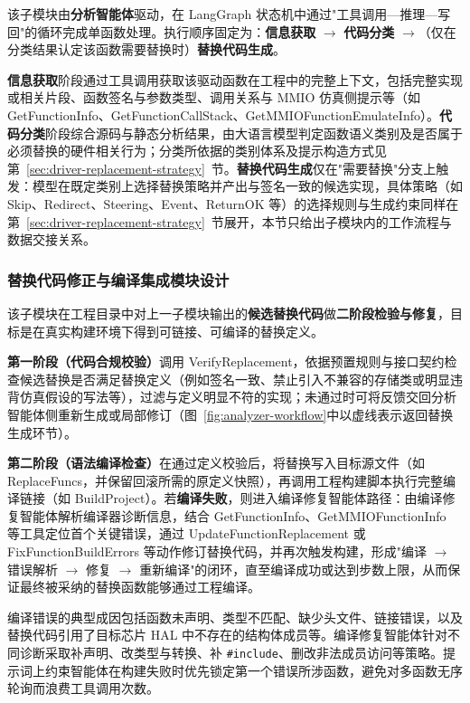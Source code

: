 该子模块由\textbf{分析智能体}驱动，在 LangGraph 状态机中通过"工具调用—推理—写回"的循环完成单函数处理。执行顺序固定为：\textbf{信息获取} $\to$ \textbf{代码分类} $\to$（仅在分类结果认定该函数需要替换时）\textbf{替换代码生成}。

\textbf{信息获取}阶段通过工具调用获取该驱动函数在工程中的完整上下文，包括完整实现或相关片段、函数签名与参数类型、调用关系与 MMIO 仿真侧提示等（如 GetFunctionInfo、GetFunctionCallStack、GetMMIOFunctionEmulateInfo）。\textbf{代码分类}阶段综合源码与静态分析结果，由大语言模型判定函数语义类别及是否属于必须替换的硬件相关行为；分类所依据的类别体系及提示构造方式见第~\ref{sec:driver-replacement-strategy}~节。\textbf{替换代码生成}仅在"需要替换"分支上触发：模型在既定类别上选择替换策略并产出与签名一致的候选实现，具体策略（如 Skip、Redirect、Steering、Event、ReturnOK 等）的选择规则与生成约束同样在第~\ref{sec:driver-replacement-strategy}~节展开，本节只给出子模块内的工作流程与数据交接关系。

\subsubsection{替换代码修正与编译集成模块设计}
\label{sec:builder-workflow}

该子模块在工程目录中对上一子模块输出的\textbf{候选替换代码}做\textbf{二阶段检验与修复}，目标是在真实构建环境下得到可链接、可编译的替换定义。

\textbf{第一阶段（代码合规校验）}调用 VerifyReplacement，依据预置规则与接口契约检查候选替换是否满足替换定义（例如签名一致、禁止引入不兼容的存储类或明显违背仿真假设的写法等），过滤与定义明显不符的实现；未通过时可将反馈交回分析智能体侧重新生成或局部修订（图~\ref{fig:analyzer-workflow}中以虚线表示返回替换生成环节）。

\textbf{第二阶段（语法编译检查）}在通过定义校验后，将替换写入目标源文件（如 ReplaceFuncs，并保留回滚所需的原定义快照），再调用工程构建脚本执行完整编译链接（如 BuildProject）。若\textbf{编译失败}，则进入编译修复智能体路径：由编译修复智能体解析编译器诊断信息，结合 GetFunctionInfo、GetMMIOFunctionInfo 等工具定位首个关键错误，通过 UpdateFunctionReplacement 或 FixFunctionBuildErrors 等动作修订替换代码，并再次触发构建，形成"编译 $\to$ 错误解析 $\to$ 修复 $\to$ 重新编译"的闭环，直至编译成功或达到步数上限，从而保证最终被采纳的替换函数能够通过工程编译。

编译错误的典型成因包括函数未声明、类型不匹配、缺少头文件、链接错误，以及替换代码引用了目标芯片 HAL 中不存在的结构体成员等。编译修复智能体针对不同诊断采取补声明、改类型与转换、补 \texttt{\#include}、删改非法成员访问等策略。提示词上约束智能体在构建失败时优先锁定第一个错误所涉函数，避免对多函数无序轮询而浪费工具调用次数。

